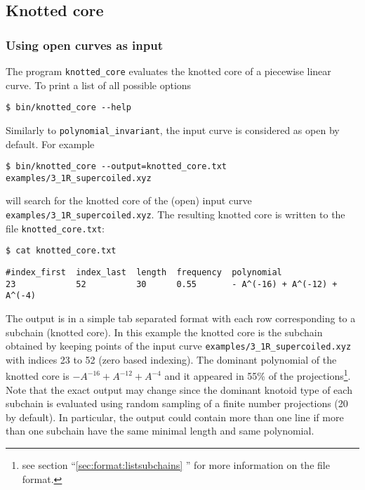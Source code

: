 \subsection{Knotted core}
\subsubsection{Using open curves as input}
The program \lstinline{knotted_core} evaluates the knotted core of a piecewise linear curve. To print a list of all possible options
\begin{lstlisting}
$ bin/knotted_core --help
\end{lstlisting}
Similarly to \lstinline{polynomial_invariant}, the input curve is considered as open by default. For example
\begin{lstlisting}
$ bin/knotted_core --output=knotted_core.txt examples/3_1R_supercoiled.xyz
\end{lstlisting}
will search for the knotted core of the (open) input curve \lstinline{examples/3_1R_supercoiled.xyz}. The resulting knotted core is written to the file \lstinline{knotted_core.txt}:
\begin{lstlisting}
$ cat knotted_core.txt
\end{lstlisting}
\begin{lstlisting}
#index_first  index_last  length  frequency  polynomial
23            52          30      0.55       - A^(-16) + A^(-12) + A^(-4)
\end{lstlisting}
The output is in a simple tab separated format with each row corresponding to a subchain (knotted core). In this example the knotted core is the subchain obtained by keeping points of the input curve \lstinline{examples/3_1R_supercoiled.xyz} with indices 23 to 52 (zero based indexing). The dominant polynomial of the knotted core is $-A^{-16}+A^{-12}+A^{-4}$ and it appeared in 55\% of the projections\footnote{see section ``\ref{sec:format:listsubchains} '' for more information on the file format.}. Note that the exact output may change since the dominant knotoid type of each subchain is evaluated using random sampling of a finite number projections (20 by default). %
In particular, the output could contain more than one line if more than one subchain have the same minimal length and same polynomial.

